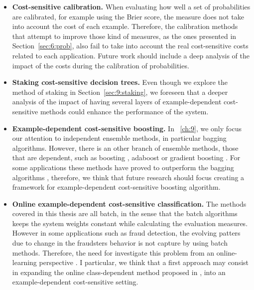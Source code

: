 \begin{itemize}
 \item \textbf{Cost-sensitive calibration.} When evaluating how well a set of probabilities are 
calibrated, for example using the Brier score, the measure does not take into account the cost of 
each example. Therefore, the calibration methods that attempt to improve those kind of measures, as 
the ones presented in Section~\ref{sec:6:prob}, also fail to take into account the real 
cost-sensitive costs related to each application. Future work should include a deep analysis of the 
impact of the costs during the calibration of probabilities.

  \item \textbf{Staking cost-sensitive decision trees.} Even though we explore the method of 
staking in Section~\ref{sec:9:staking}, we foreseen that a deeper analysis of the impact of having 
several layers of example-dependent cost-sensitive methods could enhance the performance of the 
system.

  \item \textbf{Example-dependent cost-sensitive boosting.} In \chaptername{~\ref{ch:9}}, we 
only focus our attention to independent ensemble methods, in particular bagging algorithms. 
However, there is an other branch of ensemble methods, those that are dependent, such as 
boosting \citep{Schapire1990}, adaboost \citep{Freund1996} or gradient boosting 
\citep{Friedman2001,Friedman2002}. For some applications these methods have proved to outperform 
the bagging algorithms \citep{Zhou2012}, therefore, we think that future research should focus 
creating a framework for example-dependent cost-sensitive boosting algorithm.

  \item \textbf{Online example-dependent cost-sensitive classification.} The methods covered in 
this thesis are all batch, in the sense that the batch algorithms keeps the system weights constant 
while calculating the evaluation measures. However in some applications such as fraud detection, the 
evolving patters due to change in the fraudsters behavior is not capture by using batch methods. 
Therefore, the need for investigate this problem from an online-learning perspective 
\citep{Pozzolo2014}. I particular, we think that a first approach may consist in expanding the 
online class-dependent method proposed in \citep{Wang2014}, into an example-dependent cost-sensitive 
setting.
\end{itemize}
